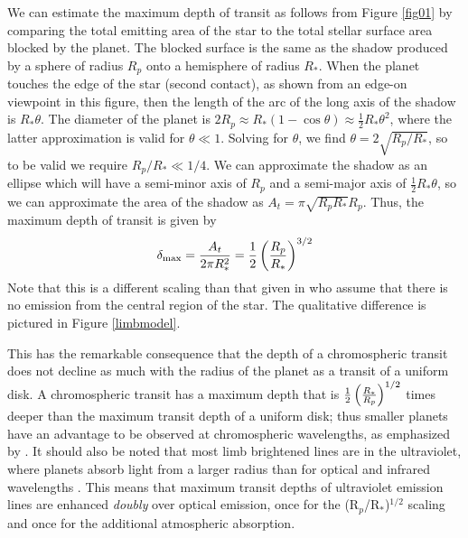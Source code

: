 \documentclass[twocolumn]{emulateapj}
\newcommand{\oi}{\ensuremath{\mathrm{O}\,\scriptstyle \mathrm{I}}}
\newcommand{\p}{R$_p$/R$_*$}
\begin{document}
We can estimate the maximum depth of transit as follows from
Figure \ref{fig01} by comparing the total emitting area of the star to the total stellar surface area blocked by the planet. The blocked surface is the same as the shadow produced by a sphere of radius $R_p$ onto a hemisphere of radius $R_*$. When the planet touches the edge of the star 
(second contact), as shown from an edge-on viewpoint in this figure,
then the length of the arc of the long axis of the shadow is
$R_*\theta$.  The diameter of the planet is 
$2 R_p \approx R_*(1-\cos{\theta}) \approx \frac{1}{2} R_* \theta^2$,
where the latter approximation is valid for $\theta \ll 1$.
Solving for $\theta$, we find $\theta = 2\sqrt{R_p/R_*}$, so to
be valid we require $R_p/R_* \ll 1/4$.  We can approximate
the shadow as an ellipse which will have a semi-minor axis of $R_p$
and a semi-major axis of $\frac{1}{2} R_*\theta$, so we can approximate the
area of the shadow as $A_t = \pi \sqrt{R_pR_*} R_p$.  Thus,
the maximum depth of transit is given by 
\begin{equation} \label{depth_anal}
\delta_{\mathrm{max}} = {A_t \over 2 \pi R_*^2} = \frac{1}{2} \left({R_p \over R_*}\right)^{3/2}
\end{equation}
Note that this is a different scaling than that given in \citet{assef} who assume that there is no emission from the central region of the star. The qualitative difference is pictured in Figure \ref{limbmodel}.


This has the remarkable consequence that the depth of a chromospheric
transit does not decline as much with the radius of the planet as 
a transit of a uniform disk.  A chromospheric transit has a maximum
depth that is $\frac{1}{2} \left({R_* \over R_p}\right)^{1/2}$
times deeper than the maximum transit depth of a uniform disk;
thus smaller planets have an advantage to be observed at
chromospheric wavelengths, as emphasized by \citet{assef}. It should also be noted that most limb brightened lines are in the ultraviolet, where planets absorb light from a larger radius than for optical and infrared wavelengths \citep{vidmad}. This means that maximum transit depths of ultraviolet emission lines are enhanced {\it doubly} over optical emission, once for the (\p )$^{1/2}$ scaling and once for the additional atmospheric absorption.
\end{document}
